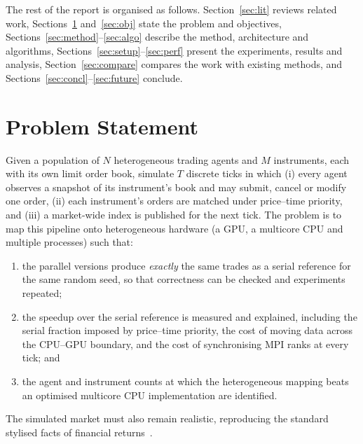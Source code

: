 The rest of the report is organised as follows. Section~\ref{sec:lit} reviews related work,
Sections~\ref{sec:problem} and~\ref{sec:obj} state the problem and objectives,
Sections~\ref{sec:method}--\ref{sec:algo} describe the method, architecture and algorithms,
Sections~\ref{sec:setup}--\ref{sec:perf} present the experiments, results and analysis,
Section~\ref{sec:compare} compares the work with existing methods, and
Sections~\ref{sec:concl}--\ref{sec:future} conclude.



\section{Problem Statement}\label{sec:problem}
Given a population of $N$ heterogeneous trading agents and $M$ instruments, each with its own
limit order book, simulate $T$ discrete ticks in which (i) every agent observes a snapshot of its
instrument's book and may submit, cancel or modify one order, (ii) each instrument's orders are
matched under price--time priority, and (iii) a market-wide index is published for the next tick.
The problem is to map this pipeline onto heterogeneous hardware (a GPU, a multicore CPU and
multiple processes) such that:
\begin{enumerate}
\item the parallel versions produce \emph{exactly} the same trades as a serial reference for the
  same random seed, so that correctness can be checked and experiments repeated;
\item the speedup over the serial reference is measured and explained, including the serial
  fraction imposed by price--time priority, the cost of moving data across the CPU--GPU boundary,
  and the cost of synchronising MPI ranks at every tick; and
\item the agent and instrument counts at which the heterogeneous mapping beats an optimised
  multicore CPU implementation are identified.
\end{enumerate}
The simulated market must also remain realistic, reproducing the standard stylised facts of
financial returns~\cite{cont2001}.

